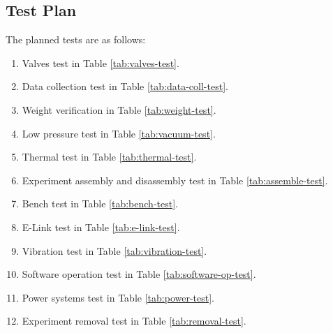 \pagebreak
\subsection{Test Plan}

The planned tests are as follows:

\begin{enumerate}
    \item Valves test in Table \ref{tab:valves-test}.
    \item Data collection test in Table \ref{tab:data-coll-test}.
    \item Weight verification in Table \ref{tab:weight-test}.
    \item Low pressure test in Table \ref{tab:vacuum-test}.
    \item Thermal test in Table \ref{tab:thermal-test}.
    \item Experiment assembly and disassembly test in Table \ref{tab:assemble-test}.
    \item Bench test in Table \ref{tab:bench-test}.
    \item E-Link test in Table \ref{tab:e-link-test}.
    \item Vibration test in Table \ref{tab:vibration-test}.
    \item Software operation test in Table \ref{tab:software-op-test}.
    \item Power systems test in Table \ref{tab:power-test}.
    \item Experiment removal test in Table \ref{tab:removal-test}.
\end{enumerate}












